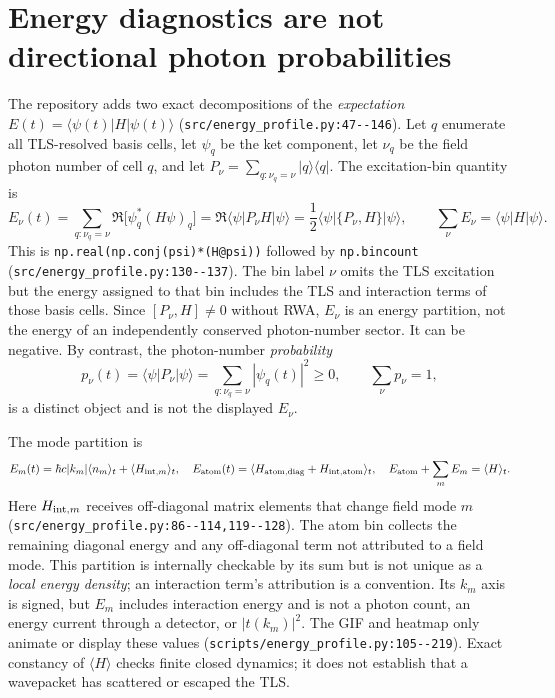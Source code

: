 \documentclass[11pt,a4paper]{article}
\newcommand{\ket}[1]{\lvert #1\rangle}
\newcommand{\bra}[1]{\langle #1\rvert}
\newcommand{\code}[1]{\nolinkurl{#1}}
\begin{document}
\section{Energy diagnostics are not directional photon probabilities}
\label{sec:energy}
The repository adds two exact decompositions of the \emph{expectation} $E(t)=\bra{\psi(t)}H\ket{\psi(t)}$ (\code{src/energy_profile.py:47--146}). Let $q$ enumerate all TLS-resolved basis cells, let $\psi_q$ be the ket component, let $\nu_q$ be the field photon number of cell $q$, and let $P_\nu=\sum_{q:\nu_q=\nu}\ket q\bra q$. The excitation-bin quantity is
\begin{equation}
 E_\nu(t)=\sum_{q:\nu_q=\nu}\Re\bigl[\psi_q^*(H\psi)_q\bigr]
 =\Re\bra\psi P_\nu H\ket\psi
 =\frac12\bra\psi\{P_\nu,H\}\ket\psi,
 \qquad\sum_\nu E_\nu=\bra\psi H\ket\psi.
 \label{eq:enu}
\end{equation}
This is \code{np.real(np.conj(psi)*(H@psi))} followed by \code{np.bincount} (\code{src/energy_profile.py:130--137}). The bin label $\nu$ omits the TLS excitation but the energy assigned to that bin includes the TLS and interaction terms of those basis cells. Since $[P_\nu,H]\ne0$ without RWA, $E_\nu$ is an energy partition, not the energy of an independently conserved photon-number sector. It can be negative. By contrast, the photon-number \emph{probability}
\begin{equation}
 p_\nu(t)=\bra\psi P_\nu\ket\psi
 =\sum_{q:\nu_q=\nu}|\psi_q(t)|^2\ge0,
 \qquad\sum_\nu p_\nu=1,
 \label{eq:pnu}
\end{equation}
is a distinct object and is not the displayed $E_\nu$.

The mode partition is
\begin{equation}
 E_m(t)=\hbar c|k_m|\langle n_m\rangle_t+\langle H_{{\rm int},m}\rangle_t,
 \quad E_{\rm atom}(t)=\langle H_{\rm atom,diag}+H_{{\rm int,atom}}\rangle_t,
 \quad E_{\rm atom}+\sum_mE_m=\langle H\rangle_t.
 \label{eq:emode}
\end{equation}
Here $H_{{\rm int},m}$ receives off-diagonal matrix elements that change field mode $m$ (\code{src/energy_profile.py:86--114,119--128}). The atom bin collects the remaining diagonal energy and any off-diagonal term not attributed to a field mode. This partition is internally checkable by its sum but is not unique as a \emph{local energy density}; an interaction term's attribution is a convention. Its $k_m$ axis is signed, but $E_m$ includes interaction energy and is not a photon count, an energy current through a detector, or $|t(k_m)|^2$. The GIF and heatmap only animate or display these values (\code{scripts/energy_profile.py:105--219}). Exact constancy of $\langle H\rangle$ checks finite closed dynamics; it does not establish that a wavepacket has scattered or escaped the TLS.
\end{document}
